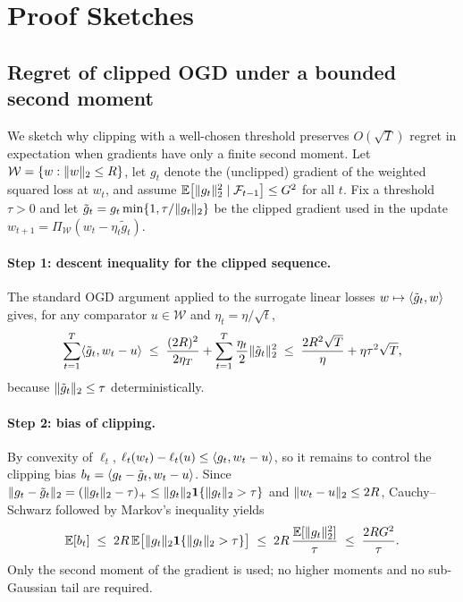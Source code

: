 
\section{Proof Sketches}
\label{app:proofs}

\subsection{Regret of clipped OGD under a bounded second moment}
\label{app:clipped-ogd}

We sketch why clipping with a well-chosen threshold preserves $O(\sqrt{T})$ regret in
expectation when gradients have only a finite second moment. Let
$\mathcal{W} = \{ w : \lVert w \rVert_2 \le R \}$, let $g_t$ denote the (unclipped) gradient of
the weighted squared loss at $w_t$, and assume $\mathbb{E} \bigl[ \lVert g_t \rVert_2^2 \mid
\mathcal{F}_{t-1} \bigr] \le G^2$ for all $t$. Fix a threshold $\tau > 0$ and let
$\tilde{g}_t = g_t \min\{1, \tau / \lVert g_t \rVert_2\}$ be the clipped gradient used in the
update $w_{t+1} = \Pi_{\mathcal{W}}(w_t - \eta_t \tilde{g}_t)$.

\paragraph{Step 1: descent inequality for the clipped sequence.} The standard OGD
argument \citep{zinkevich2003online,hazan2016introduction} applied to the surrogate
linear losses $w \mapsto \langle \tilde{g}_t, w \rangle$ gives, for any comparator
$u \in \mathcal{W}$ and $\eta_t = \eta/\sqrt{t}$,
\begin{equation}
\sum_{t=1}^{T} \langle \tilde{g}_t, w_t - u \rangle
\;\le\; \frac{(2R)^2}{2\eta_T} + \sum_{t=1}^{T} \frac{\eta_t}{2} \lVert \tilde{g}_t \rVert_2^2
\;\le\; \frac{2R^2 \sqrt{T}}{\eta} + \eta \tau^2 \sqrt{T},
\end{equation}
because $\lVert \tilde{g}_t \rVert_2 \le \tau$ deterministically.

\paragraph{Step 2: bias of clipping.} By convexity of $\ell_t$,
$\ell_t(w_t) - \ell_t(u) \le \langle g_t, w_t - u \rangle$, so it remains to control the clipping
bias $b_t = \langle g_t - \tilde{g}_t, w_t - u \rangle$. Since
$\lVert g_t - \tilde{g}_t \rVert_2 = (\lVert g_t \rVert_2 - \tau)_+ \le
\lVert g_t \rVert_2 \mathbf{1}\{\lVert g_t \rVert_2 > \tau\}$ and $\lVert w_t - u \rVert_2 \le 2R$,
Cauchy--Schwarz followed by Markov's inequality yields
\begin{equation}
\mathbb{E}[b_t]
\;\le\; 2R \, \mathbb{E}\bigl[ \lVert g_t \rVert_2 \mathbf{1}\{ \lVert g_t \rVert_2 > \tau \} \bigr]
\;\le\; 2R \, \frac{\mathbb{E}[\lVert g_t \rVert_2^2]}{\tau}
\;\le\; \frac{2 R G^2}{\tau}.
\end{equation}
Only the second moment of the gradient is used; no higher moments and no sub-Gaussian
tail are required.

